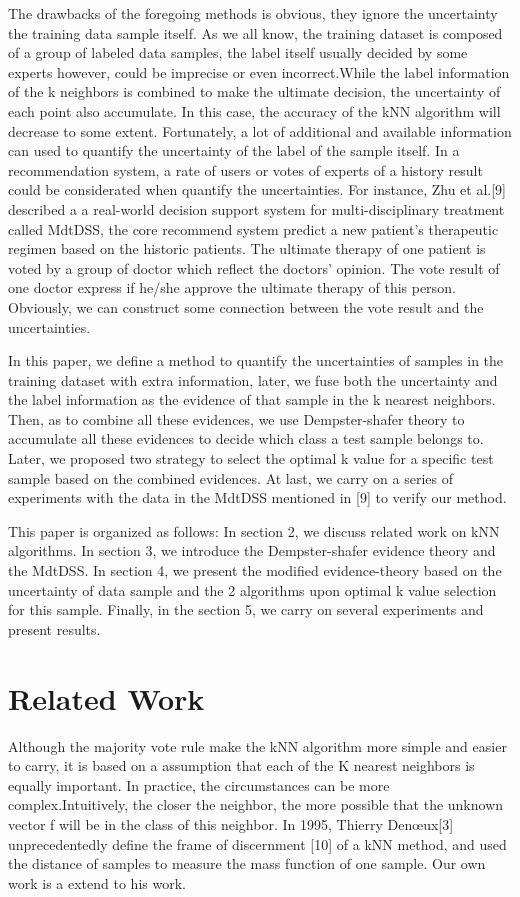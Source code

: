 \documentclass[runningheads]{llncs}
\begin{document}
The drawbacks of the foregoing methods is obvious, they ignore the uncertainty the training data sample itself. As we all know, the training dataset is composed of a group of labeled data samples, the label itself usually decided by some experts however, could be imprecise or even incorrect.While the label information of the k neighbors is combined to make the ultimate decision, the uncertainty of each point also accumulate. In this case, the accuracy of the kNN algorithm will decrease to some extent. Fortunately, a lot of additional and available information can used to quantify the uncertainty of the label of the sample itself. In a recommendation system, a rate of users or votes of experts of a history result could be considerated when quantify the uncertainties. For instance, Zhu et al.[9] described a a real-world decision support system for multi-disciplinary treatment called MdtDSS, the core recommend system predict a new patient's therapeutic regimen based on the historic patients. The ultimate therapy of one patient is voted by a group of doctor which reflect the doctors' opinion. The vote result of one doctor express if he/she approve the ultimate therapy of this person. Obviously, we can construct some connection between the vote result and the uncertainties.

In this paper, we define a method to quantify the uncertainties of samples in the training dataset with extra information, later, we fuse both the uncertainty and the label information as the evidence of that sample in the k nearest neighbors. Then, as to combine all these evidences, we use Dempster-shafer theory to accumulate  all these evidences to decide which class a test sample belongs to. Later, we proposed two strategy to select the optimal k value for a specific test sample based on the combined evidences. At last, we carry on a series of experiments with the data in the MdtDSS mentioned in [9] to verify our method.

This paper is organized as follows: In section 2, we discuss related work on kNN algorithms. In section 3, we introduce the Dempster-shafer evidence theory and the MdtDSS. In section 4, we present the modified evidence-theory based on the uncertainty of data sample and the 2 algorithms upon optimal k value selection for this sample. Finally, in the section 5, we carry on several experiments and present results.


\section{Related Work}
Although the majority vote rule make the kNN algorithm more simple and easier to carry, it is based on a assumption that each of the K nearest neighbors is equally important. In practice, the circumstances can be more complex.Intuitively, the closer the neighbor, the more possible that the unknown vector f will be in the class of this neighbor. In 1995, Thierry Denœux[3] unprecedentedly define the frame of discernment [10] of a kNN method, and used  the distance of samples to measure the mass function of one sample. Our own work is a extend to his work.
\end{document}

